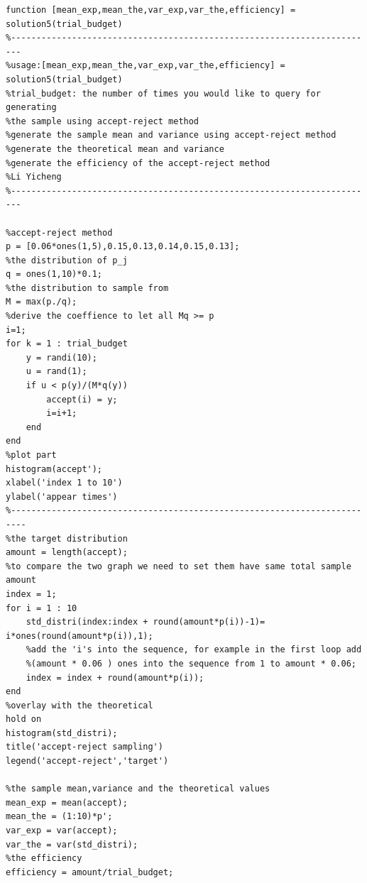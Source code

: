 \documentclass[twoside]{article}
\begin{document}
\begin{lstlisting}
function [mean_exp,mean_the,var_exp,var_the,efficiency] = solution5(trial_budget)
%------------------------------------------------------------------------
%usage:[mean_exp,mean_the,var_exp,var_the,efficiency] = solution5(trial_budget)
%trial_budget: the number of times you would like to query for generating
%the sample using accept-reject method
%generate the sample mean and variance using accept-reject method
%generate the theoretical mean and variance
%generate the efficiency of the accept-reject method
%Li Yicheng
%------------------------------------------------------------------------

%accept-reject method
p = [0.06*ones(1,5),0.15,0.13,0.14,0.15,0.13];
%the distribution of p_j
q = ones(1,10)*0.1;
%the distribution to sample from
M = max(p./q);
%derive the coeffience to let all Mq >= p
i=1;
for k = 1 : trial_budget
    y = randi(10);
    u = rand(1);
    if u < p(y)/(M*q(y))
        accept(i) = y;
        i=i+1;
    end
end
%plot part
histogram(accept');
xlabel('index 1 to 10')
ylabel('appear times')
%-------------------------------------------------------------------------
%the target distribution
amount = length(accept);
%to compare the two graph we need to set them have same total sample amount
index = 1;
for i = 1 : 10
    std_distri(index:index + round(amount*p(i))-1)= i*ones(round(amount*p(i)),1);
    %add the 'i's into the sequence, for example in the first loop add
    %(amount * 0.06 ) ones into the sequence from 1 to amount * 0.06;
    index = index + round(amount*p(i));
end
%overlay with the theoretical
hold on
histogram(std_distri);
title('accept-reject sampling')
legend('accept-reject','target')

%the sample mean,variance and the theoretical values
mean_exp = mean(accept);
mean_the = (1:10)*p';
var_exp = var(accept);
var_the = var(std_distri);
%the efficiency
efficiency = amount/trial_budget;
\end{lstlisting}
\end{document}
